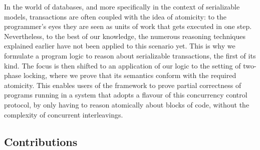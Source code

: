 In the world of databases, and more specifically in the context of serializable models, transactions are often coupled with the idea of atomicity: to the programmer's eyes they are seen as units of work that gets executed in one step. Nevertheless, to the best of our knowledge, the numerous reasoning techniques explained earlier have not been applied to this scenario yet. This is why we formulate a program logic to reason about serializable transactions, the first of its kind. The focus is then shifted to an application of our logic to the setting of two-phase locking, where we prove that its semantics conform with the required atomicity. This enables users of the framework to prove partial correctness of  programs running in a system that adopts a flavour of this concurrency control protocol, by only having to reason atomically about blocks of code, without the complexity of concurrent interleavings. 

\subsection{Contributions}


